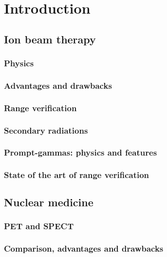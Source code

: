 \chapter{Introduction}\label{chap::1}

\section{Ion beam therapy}

\subsection{Physics}

\subsection{Advantages and drawbacks}

\subsection{Range verification}

\subsection{Secondary radiations}

\subsection{Prompt-gammas: physics and features}

\subsection{State of the art of range verification}


\section{Nuclear medicine}

\subsection{PET and SPECT}

\subsection{Comparison, advantages and drawbacks}

